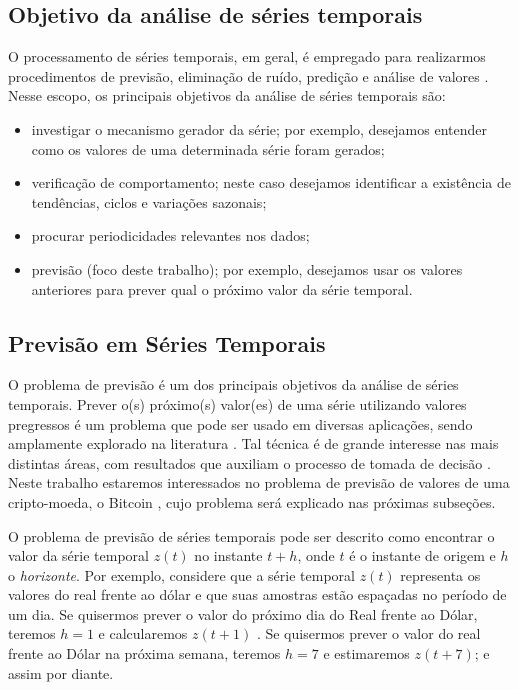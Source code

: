 \subsection{Objetivo da análise de séries temporais}

O processamento de séries temporais, em geral, é empregado para realizarmos procedimentos de previsão, eliminação de ruído, predição e análise de valores \cite{morettin2006analise, hyndman2018forecasting}. Nesse escopo, os principais objetivos da análise de séries temporais são:

\begin{itemize}
\item investigar o mecanismo gerador da série; por exemplo, desejamos entender como os valores de uma determinada série foram gerados;
\item verificação de comportamento; neste caso desejamos identificar a existência de tendências, ciclos e variações sazonais;
\item procurar periodicidades relevantes nos dados;
\item previsão (foco deste trabalho); por exemplo, desejamos usar os valores anteriores para prever qual o próximo valor da série temporal.
\end{itemize}

\subsection{Previsão em Séries Temporais}

O problema de previsão é um dos principais objetivos da análise de séries temporais. Prever o(s) próximo(s) valor(es) de uma série utilizando valores pregressos é um problema que pode ser usado em diversas aplicações, sendo amplamente explorado na literatura \cite{weigend2018time}. Tal técnica é de grande interesse nas mais distintas áreas, com resultados que auxiliam o processo de tomada de decisão \cite{morettin2006analise, hyndman2018forecasting}. Neste trabalho estaremos interessados no problema de previsão de valores de uma cripto-moeda, o Bitcoin \cite{nakamoto2008bitcoin}, cujo problema será explicado nas próximas subseções.

O problema de previsão de séries temporais pode ser descrito como encontrar o valor da série temporal $z(t)$ no instante $t + h$, onde $t$ é o instante de origem e $h$ o \textit{horizonte}. Por exemplo, considere que a série temporal $z(t)$ representa os valores do real frente ao dólar e que suas amostras estão espaçadas no período de um dia. Se quisermos prever o valor do próximo dia do Real frente ao Dólar, teremos $h = 1$ e calcularemos $z(t + 1)$ . Se quisermos prever o valor do real frente ao Dólar na próxima semana, teremos $h = 7$ e estimaremos $z(t + 7)$; e assim por diante. 

